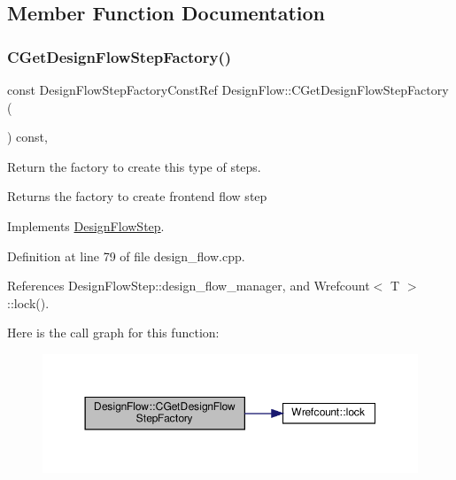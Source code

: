 \subsection{Member Function Documentation}
\mbox{\label{classDesignFlow_a5c46b102b9346c38c5a85a1841588bda}} 
\subsubsection{\texorpdfstring{C\+Get\+Design\+Flow\+Step\+Factory()}{CGetDesignFlowStepFactory()}}
{\footnotesize\ttfamily const Design\+Flow\+Step\+Factory\+Const\+Ref Design\+Flow\+::\+C\+Get\+Design\+Flow\+Step\+Factory (\begin{DoxyParamCaption}{ }\end{DoxyParamCaption}) const\hspace{0.3cm}{\ttfamily [override]}, {\ttfamily [virtual]}}



Return the factory to create this type of steps. 

\begin{DoxyReturn}{Returns}
the factory to create frontend flow step 
\end{DoxyReturn}


Implements \hyperlink{classDesignFlowStep_a5510a8d296670a07f6b53312c448994c}{Design\+Flow\+Step}.



Definition at line 79 of file design\+\_\+flow.\+cpp.



References Design\+Flow\+Step\+::design\+\_\+flow\+\_\+manager, and Wrefcount$<$ T $>$\+::lock().

Here is the call graph for this function\+:
\nopagebreak
\begin{figure}[H]
\begin{center}
\leavevmode
\includegraphics[width=350pt]{d2/d61/classDesignFlow_a5c46b102b9346c38c5a85a1841588bda_cgraph}
\end{center}
\end{figure}
\mbox{\label{classDesignFlow_acdb609fb0873cfd4cb342157d4972d01}} 

